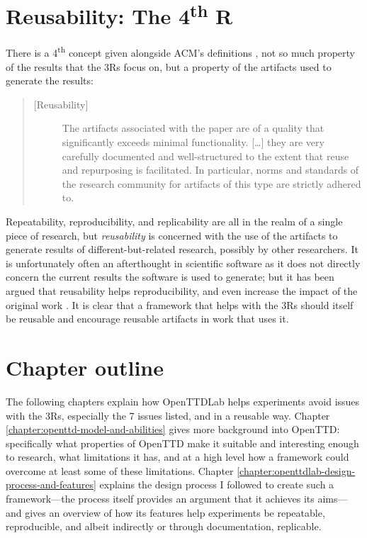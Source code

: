 \documentclass[logo,msc,dsti]{style/infthesis}    %
\begin{document}
{\section{Reusability: The 4\texorpdfstring{\textsuperscript{th}}{th} R}

There is a 4\textsuperscript{th} concept given alongside ACM's definitions \cite{association_for_computing_machiner_new_2020}, not so much property of the results that the 3Rs focus on, but a property of the artifacts used to generate the results:

\begin{quote}
\begin{description}
\item[{[}Reusability{]}] 
The artifacts associated with the paper are of a quality that significantly exceeds minimal functionality. [\ldots] they are very carefully documented and well-structured to the extent that reuse and repurposing is facilitated. In particular, norms and standards of the research community for artifacts of this type are strictly adhered to. 
\end{description}
\end{quote}
Repeatability, reproducibility, and replicability are all in the realm of a single piece of research, but \emph{reusability} is concerned with the use of the artifacts to generate results of different-but-related research, possibly by other researchers. It is unfortunately often an afterthought in scientific software as it does not directly concern the current results the software is used to generate; but it has been argued that reusability helps reproducibility, and even increase the impact of the original work \cite{benureau2018re}. It is clear that a framework that helps with the 3Rs should itself be reusable and encourage reusable artifacts in work that uses it.

\section{Chapter outline}

The following chapters explain how OpenTTDLab helps experiments avoid issues with the 3Rs, especially the 7 issues listed, and in a reusable way. Chapter \ref{chapter:openttd-model-and-abilities} gives more background into OpenTTD: specifically what properties of OpenTTD make it suitable and interesting enough to research, what limitations it has, and at a high level how a framework could overcome at least some of these limitations. Chapter \ref{chapter:openttdlab-design-process-and-features} explains the design process I followed to create such a framework---the process itself provides an argument that it achieves its aims---and gives an overview of how its features help experiments be repeatable, reproducible, and albeit indirectly or through documentation, replicable. 

}
\end{document}
